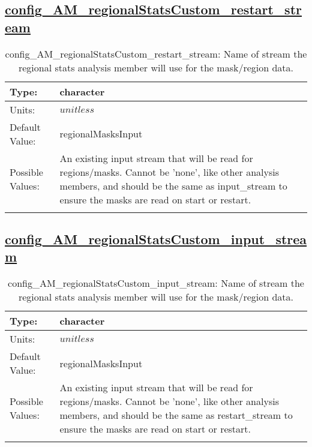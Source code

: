 \subsection[config\_AM\_regionalStatsCustom\_restart\_stream]{\hyperref[sec:nm_tab_AM_regionalStatsCustom]{config\_AM\_regionalStatsCustom\_restart\_stream}}
\label{subsec:nm_sec_config_AM_regionalStatsCustom_restart_stream}
\begin{center}
\begin{longtable}{| p{2.0in} || p{4.0in} |}
    \hline
    Type: & character \\
    \hline
    Units: & $unitless$ \\
    \hline
    Default Value: & regionalMasksInput \\
    \hline
    Possible Values: & An existing input stream that will be read for regions/masks. Cannot be 'none', like other analysis members, and should be the same as input\_stream to ensure the masks are read on start or restart. \\
    \hline
    \caption{config\_AM\_regionalStatsCustom\_restart\_stream: Name of stream the regional stats analysis member will use for the mask/region data.}
\end{longtable}
\end{center}
\subsection[config\_AM\_regionalStatsCustom\_input\_stream]{\hyperref[sec:nm_tab_AM_regionalStatsCustom]{config\_AM\_regionalStatsCustom\_input\_stream}}
\label{subsec:nm_sec_config_AM_regionalStatsCustom_input_stream}
\begin{center}
\begin{longtable}{| p{2.0in} || p{4.0in} |}
    \hline
    Type: & character \\
    \hline
    Units: & $unitless$ \\
    \hline
    Default Value: & regionalMasksInput \\
    \hline
    Possible Values: & An existing input stream that will be read for regions/masks. Cannot be 'none', like other analysis members, and should be the same as restart\_stream to ensure the masks are read on start or restart. \\
    \hline
    \caption{config\_AM\_regionalStatsCustom\_input\_stream: Name of stream the regional stats analysis member will use for the mask/region data.}
\end{longtable}
\end{center}
